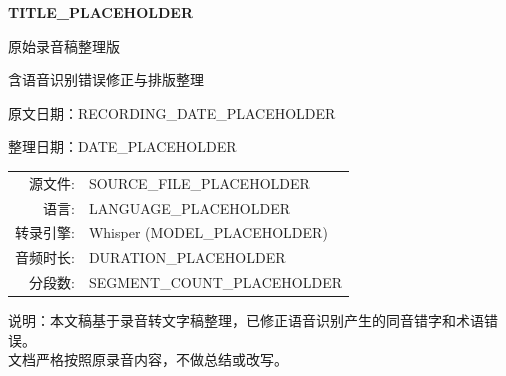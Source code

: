 \documentclass[12pt,a4paper]{ctexart}
\begin{document}
\begin{titlepage}
\centering
\vspace*{4cm}

{\Huge\bfseries\color{chaptercolor} TITLE_PLACEHOLDER \par}

\vspace{1.5cm}
{\large 原始录音稿整理版\par}
{\normalsize 含语音识别错误修正与排版整理\par}

\vspace{2cm}
{\normalsize 原文日期：RECORDING_DATE_PLACEHOLDER \par}
{\normalsize 整理日期：DATE_PLACEHOLDER \par}

\vspace{1.5cm}

\begin{minipage}{0.75\textwidth}
\centering
\small\color{timemark}
\begin{tabularx}{\textwidth}{rX}
源文件:      & SOURCE_FILE_PLACEHOLDER \\
语言:        & LANGUAGE_PLACEHOLDER \\
转录引擎:    & Whisper (MODEL_PLACEHOLDER) \\
音频时长:    & DURATION_PLACEHOLDER \\
分段数:      & SEGMENT_COUNT_PLACEHOLDER \\
\end{tabularx}
\end{minipage}

\vfill
{\small\color{timemark}说明：本文稿基于录音转文字稿整理，已修正语音识别产生的同音错字和术语错误。\\
文档严格按照原录音内容，不做总结或改写。}
\end{titlepage}

\tableofcontents
\newpage


\end{document}
